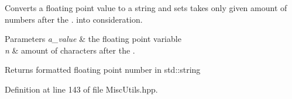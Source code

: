 Converts a floating point value to a string and sets takes only given amount of numbers after the \textquotesingle{}.\textquotesingle{} into consideration. 


\begin{DoxyParams}{Parameters}
{\em a\+\_\+value} & the floating point variable\\
\hline
{\em n} & amount of characters after the \textquotesingle{}.\textquotesingle{}\\
\hline
\end{DoxyParams}
\begin{DoxyReturn}{Returns}
formatted floating point number in std\+::string \begin{DoxyVerb}\end{DoxyVerb}
 
\end{DoxyReturn}


Definition at line 143 of file Misc\+Utils.\+hpp.


\begin{DoxyCode}{0}

\end{DoxyCode}
